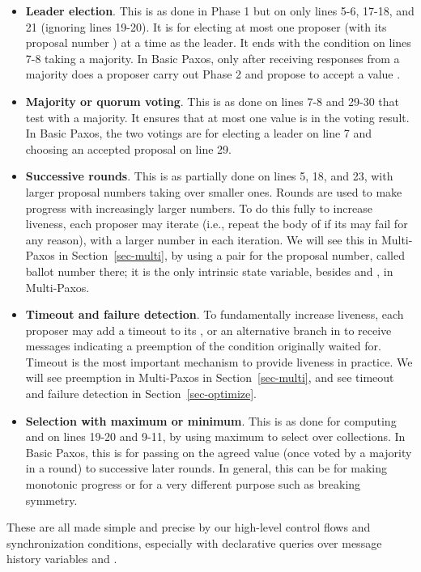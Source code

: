 \documentclass[11pt]{article}
\begin{document}
\begin{itemize}
  \setlength{\itemsep}{0ex}

\item {\bf Leader election}. This is as done in Phase 1 but on only lines
  5-6, 17-18, and 21 (ignoring lines 19-20).
  It is for electing at most one proposer (with its proposal number )
  at a time as the leader.  It ends with the  condition on lines
  7-8 taking a majority.  In Basic Paxos, only after receiving responses
  from a majority does a proposer carry out Phase 2 and propose to accept a
  value .

\item {\bf Majority or quorum voting}.  This is as done on lines 7-8 and
  29-30 that test with a majority.  It ensures that at most one value is in
  the voting result.  In Basic Paxos, the two votings are for electing a
  leader  on line 7 and choosing an accepted proposal  on
  line 29.

\item {\bf Successive rounds}.  This is as partially done on lines 5, 18,
  and 23, with larger proposal numbers taking over smaller ones.  Rounds
  are used to make progress with increasingly larger numbers.  To do this
  fully to increase liveness, each proposer may iterate (i.e., repeat the
  body of  if its  may fail for any reason), with a
  larger number  in each iteration.  We will see this in Multi-Paxos
  in Section~\ref{sec-multi}, by using a pair for the proposal number,
  called ballot number there; it is the only intrinsic state variable,
  besides  and , in Multi-Paxos.

\item {\bf Timeout and failure detection}.  To fundamentally increase
  liveness, each proposer may add a timeout to its , or an
  alternative branch in  to receive messages indicating a
  preemption of the condition originally waited for.  Timeout is the most
  important mechanism to provide liveness in practice. We will see
  preemption in Multi-Paxos in Section~\ref{sec-multi}, and see timeout and
  failure detection in Section~\ref{sec-optimize}.

\item {\bf Selection with maximum or minimum}.  This is as done for
  computing  and  on lines 19-20 and 9-11, by using
  maximum to select over collections.  In Basic Paxos, this is for passing
  on the agreed value (once voted by a majority in a round) to successive
  later rounds.  In general, this can be for making monotonic progress
  or for a very different purpose such as breaking symmetry.

\end{itemize}
These are all made simple and precise by our high-level control flows and
synchronization conditions, especially with declarative queries over
message history variables  and .
\end{document}
